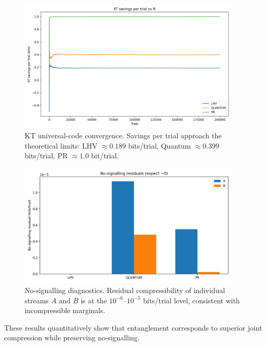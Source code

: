 \documentclass[aps,preprint,onecolumn,longbibliography,nofootinbib]{revtex4-2}
\numberwithin{equation}{section}        %
\begin{document}
\begin{figure}[H]
\centering
\includegraphics[width=0.95\textwidth]{KT_savings_per_trial_vs_N.png}
\caption{KT universal-code convergence. Savings per trial approach the theoretical limits: LHV $\approx 0.189$ bits/trial, Quantum $\approx 0.399$ bits/trial, PR $\approx 1.0$ bit/trial.}
\label{fig:kt_convergence}
\end{figure}

\begin{figure}[H]
\centering
\includegraphics[width=0.95\textwidth]{No-signalling_residuals_expect_0_.png}
\caption{No-signalling diagnostics. Residual compressibility of individual streams $A$ and $B$ is at the $10^{-6}$--$10^{-5}$ bits/trial level, consistent with incompressible marginals.}
\label{fig:nosig}
\end{figure}

\noindent These results quantitatively show that entanglement corresponds to superior joint compression while preserving no-signalling.

\end{document}
